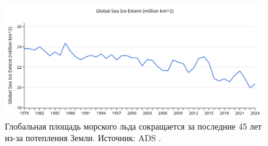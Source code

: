 \documentclass[10pt,twocolumn,letterpaper]{article}
\begin{document}
\begin{figure}[t]
\begin{center}
\includegraphics[width=1\textwidth]{ice.jpg}
\end{center}
   \caption{Глобальная площадь морского льда сокращается за последние 45 лет из-за потепления Земли. Источник: ADS \cite{149}.}
\label{fig:24}
\end{figure}

\clearpage
\twocolumn

{\small


}
\end{document}
